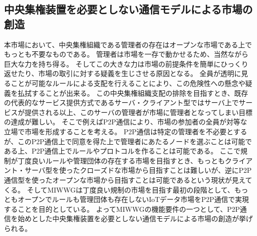 \subsection{中央集権装置を必要としない通信モデルによる市場の創造}
本市場において、中央集権組織である管理者の存在はオープンな市場である上でもっとも不要なものである。
管理者は市場を一存で動かせるため、当然ながら巨大な力を持ち得る。
そしてこの大きな力は市場の前提条件を簡単にひっくり返せたり、市場の取引に対する疑義を生じさせる原因となる。
全員が透明に見ることが可能なルールによる支配を行えることにより、この危険性への懸念や疑義を払拭することが出来る。
この中央集権組織支配の排除を目指すとき、既存の代表的なサービス提供方式であるサーバ・クライアント型ではサーバ上でサービスが提供される以上、このサーバの管理者が市場に管理者となってしまい目標の達成が難しい。
そこで例えばP2P通信により、市場の参加者の全員が対等な立場で市場を形成することを考える。
P2P通信は特定の管理者を不必要とするが、このP2P通信上で同意を得た上で管理者にあたるノードを選ぶことは可能である上、P2P通信上でルールやプロトコルを作ることは可能である。
ここで規制が丁度良いルールや管理団体の存在する市場を目指すとき、もっともクライアント・サーバ型を使ったクローズドな市場から目指すことは難しいが、逆にP2P通信型を使ったオープンな市場から目指すことは可能であるという現状が見えてくる。
そしてMIWWGは丁度良い規制の市場を目指す最初の段階として、もっともオープンでルールも管理団体も存在しないIoTデータ市場をP2P通信で実現することを目的としている。
よってMIWWGの機能要件の一つとして、P2P通信を始めとした中央集権装置を必要としない通信モデルによる市場の創造が挙げられる。

